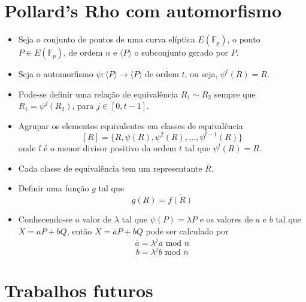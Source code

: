 \documentclass{beamer}
\begin{document}
\section{Pollard's Rho com automorfismo}
\begin{frame}
  \begin{itemize}
    \item Seja o conjunto de pontos de uma curva elíptica $E(\mathbb{F}_p)$, o ponto $P \in E(\mathbb{F}_p)$, de ordem $n$ e $\langle P \rangle$ o subconjunto gerado por $P$.
    \item Seja o automorfismo $\psi: \langle P \rangle \to \langle P \rangle$ de ordem $t$, ou seja, $\psi^t(R) = R$.
    \item Pode-se definir uma relação de equivalência $R_1 \sim R_2$ sempre que $R_1 = \psi^j(R_2)$, para $j \in [0, t-1]$.
    \item Agrupar os elementos equivalentes em classes de equivalência
    $$
      [R] = \{R, \psi(R), \psi^2(R), \dots, \psi^{l-1}(R)\}
    $$
    onde $l$ é o menor divisor positivo da ordem $t$ tal que $\psi^l(R) = R$.
    \item Cada classe de equivalência tem um representante $\overline{R}$.
  \end{itemize}
\end{frame}
\begin{frame}
  \begin{itemize}
    \item Definir uma função $g$ tal que
    $$
      g(R) = \overline{f(R)}
    $$
    \item Conhecendo-se o valor de $\lambda$ tal que $\psi(P) = \lambda P$ e os valores de $a$ e $b$ tal que $X = aP + bQ$, então $\overline{X} = \overline{a}P + \overline{b}Q$ pode ser calculado por
    $$
      \overline{a} = \lambda^j a \mbox{ mod } n
    $$
    $$
      \overline{b} = \lambda^j b \mbox{ mod } n
    $$
  \end{itemize}
\end{frame}
%
%

\section{Trabalhos futuros}
\begin{frame}

\end{frame}
\end{document}
